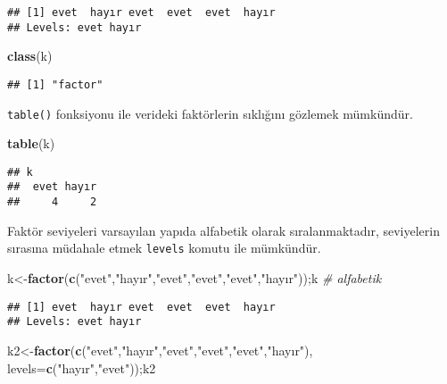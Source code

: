 \documentclass[
]{book}
\newenvironment{Shaded}{\begin{snugshade}}{\end{snugshade}}
\newcommand{\CommentTok}[1]{\textcolor[rgb]{0.56,0.35,0.01}{\textit{#1}}}
\newcommand{\DataTypeTok}[1]{\textcolor[rgb]{0.13,0.29,0.53}{#1}}
\newcommand{\KeywordTok}[1]{\textcolor[rgb]{0.13,0.29,0.53}{\textbf{#1}}}
\newcommand{\NormalTok}[1]{#1}
\newcommand{\StringTok}[1]{\textcolor[rgb]{0.31,0.60,0.02}{#1}}
\begin{document}
\begin{verbatim}
## [1] evet  hayır evet  evet  evet  hayır
## Levels: evet hayır
\end{verbatim}

\begin{Shaded}
\begin{Highlighting}[]
\KeywordTok{class}\NormalTok{(k)}
\end{Highlighting}
\end{Shaded}

\begin{verbatim}
## [1] "factor"
\end{verbatim}

\texttt{table()} fonksiyonu ile verideki faktörlerin sıklığını gözlemek mümkündür.

\begin{Shaded}
\begin{Highlighting}[]
\KeywordTok{table}\NormalTok{(k)}
\end{Highlighting}
\end{Shaded}

\begin{verbatim}
## k
##  evet hayır 
##     4     2
\end{verbatim}

Faktör seviyeleri varsayılan yapıda alfabetik olarak sıralanmaktadır, seviyelerin sırasına müdahale etmek \texttt{levels} komutu ile mümkündür.

\begin{Shaded}
\begin{Highlighting}[]
\NormalTok{k<-}\KeywordTok{factor}\NormalTok{(}\KeywordTok{c}\NormalTok{(}\StringTok{"evet"}\NormalTok{,}\StringTok{"hayır"}\NormalTok{,}\StringTok{"evet"}\NormalTok{,}\StringTok{"evet"}\NormalTok{,}\StringTok{"evet"}\NormalTok{,}\StringTok{"hayır"}\NormalTok{));k  }\CommentTok{# alfabetik}
\end{Highlighting}
\end{Shaded}

\begin{verbatim}
## [1] evet  hayır evet  evet  evet  hayır
## Levels: evet hayır
\end{verbatim}

\begin{Shaded}
\begin{Highlighting}[]
\NormalTok{k2<-}\KeywordTok{factor}\NormalTok{(}\KeywordTok{c}\NormalTok{(}\StringTok{"evet"}\NormalTok{,}\StringTok{"hayır"}\NormalTok{,}\StringTok{"evet"}\NormalTok{,}\StringTok{"evet"}\NormalTok{,}\StringTok{"evet"}\NormalTok{,}\StringTok{"hayır"}\NormalTok{), }\DataTypeTok{levels=}\KeywordTok{c}\NormalTok{(}\StringTok{"hayır"}\NormalTok{,}\StringTok{"evet"}\NormalTok{));k2}
\end{Highlighting}
\end{Shaded}
\end{document}
